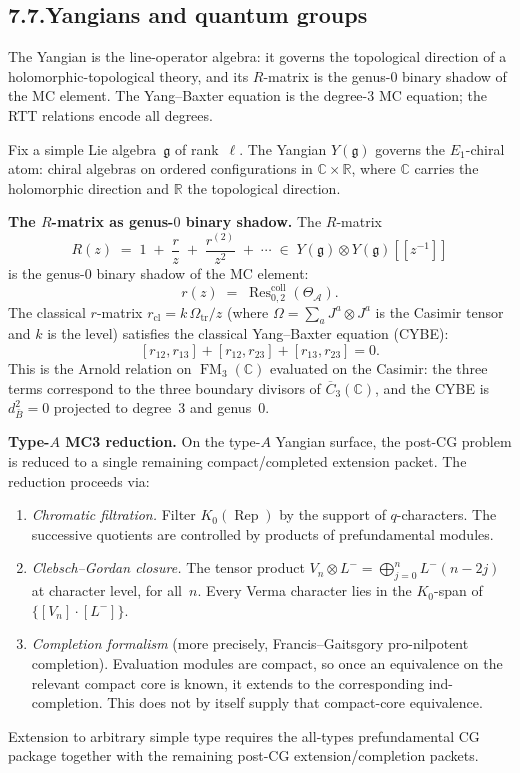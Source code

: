 \documentclass[11pt]{report}
\theoremstyle{definition}
\theoremstyle{remark}
\providecommand{\cA}{\mathcal{A}}
\providecommand{\barB}{\bar{B}}
\numberwithin{equation}{section}
\begin{document}
\subsection*{7.7.\quad Yangians and quantum groups}

The Yangian is the line-operator algebra: it governs the topological
direction of a holomorphic-topological theory, and its $R$-matrix is
the genus-$0$ binary shadow of the MC element. The Yang--Baxter
equation is the degree-$3$ MC equation; the RTT relations encode all
degrees.

Fix a simple Lie algebra~$\mathfrak g$ of rank~$\ell$. The Yangian
$Y(\mathfrak g)$ governs the $E_1$-chiral atom: chiral algebras on
ordered configurations in $\mathbb C\times\mathbb R$, where
$\mathbb C$ carries the holomorphic direction and $\mathbb R$ the
topological direction.

\medskip
\noindent\textbf{The $R$-matrix as genus-$0$ binary shadow.}
The $R$-matrix
\[
R(z)
\;=\;
1\;+\;\frac{r}{z}\;+\;\frac{r^{(2)}}{z^2}\;+\;\cdots
\;\in\;
Y(\mathfrak g)\otimes Y(\mathfrak g)[[z^{-1}]]
\]
is the genus-$0$ binary shadow of the MC element:
\[
r(z) \;=\; \operatorname{Res}^{\mathrm{coll}}_{0,2}(\Theta_\cA).
\]
The classical $r$-matrix $r_{\mathrm{cl}}=k\,\Omega_{\mathrm{tr}}/z$ (where
$\Omega=\sum_a J^a\otimes J^a$ is the Casimir tensor and $k$ is the
level) satisfies the classical Yang--Baxter equation (CYBE):
\[
[r_{12},r_{13}]+[r_{12},r_{23}]+[r_{13},r_{23}] = 0.
\]
This is the Arnold relation on $\operatorname{FM}_3(\mathbb C)$
evaluated on the Casimir: the three terms correspond to the three
boundary divisors of $\overline C_3(\mathbb C)$, and the CYBE is
$d_{\barB}^2=0$ projected to degree~$3$ and genus~$0$.

\medskip
\noindent\textbf{Type-$A$ MC3 reduction.}
On the type-$A$ Yangian surface, the post-CG problem is reduced to a
single remaining compact/completed extension packet. The reduction
proceeds via:
\begin{enumerate}[label=(\alph*),nosep]
\item \emph{Chromatic filtration.} Filter
 $K_0(\operatorname{Rep})$ by the support of $q$-characters. The
 successive quotients are controlled by products of prefundamental
 modules.
\item \emph{Clebsch--Gordan closure.} The tensor product
 $V_n\otimes L^-=\bigoplus_{j=0}^n L^-(n-2j)$ at character level,
 for all~$n$. Every Verma character lies in the $K_0$-span of
 $\{[V_n]\cdot[L^-]\}$.
\item \emph{Completion formalism} (more precisely,
 Francis--Gaitsgory pro-nilpotent completion). Evaluation modules
 are compact, so once an equivalence on the relevant compact core is
 known, it extends to the corresponding ind-completion. This does
 not by itself supply that compact-core equivalence.
\end{enumerate}
Extension to arbitrary simple type requires the all-types
prefundamental CG package together with the remaining post-CG
extension/completion packets.
\end{document}
